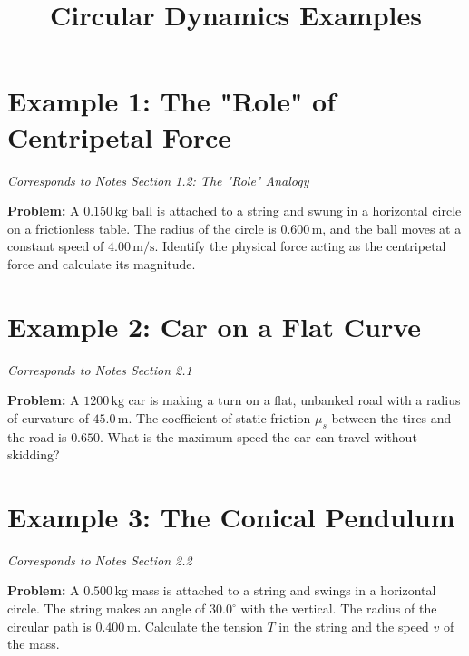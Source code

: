 \documentclass[12pt]{article}
\begin{document}
\title{Circular Dynamics Examples}
\author{}
\date{}
\maketitle

\vspace{1em}

\section*{Example 1: The "Role" of Centripetal Force}
\textit{Corresponds to Notes Section 1.2: The "Role" Analogy}

\textbf{Problem:}
A $0.150 \, \text{kg}$ ball is attached to a string and swung in a horizontal circle on a frictionless table. The radius of the circle is $0.600 \, \text{m}$, and the ball moves at a constant speed of $4.00 \, \text{m/s}$. 
Identify the physical force acting as the centripetal force and calculate its magnitude.

\newpage

\section*{Example 2: Car on a Flat Curve}
\textit{Corresponds to Notes Section 2.1}

\textbf{Problem:}
A $1200 \, \text{kg}$ car is making a turn on a flat, unbanked road with a radius of curvature of $45.0 \, \text{m}$. The coefficient of static friction $\mu_s$ between the tires and the road is $0.650$. What is the maximum speed the car can travel without skidding?

\newpage

\section*{Example 3: The Conical Pendulum}
\textit{Corresponds to Notes Section 2.2}

\textbf{Problem:}
A $0.500 \, \text{kg}$ mass is attached to a string and swings in a horizontal circle. The string makes an angle of $30.0^\circ$ with the vertical. The radius of the circular path is $0.400 \, \text{m}$. Calculate the tension $T$ in the string and the speed $v$ of the mass.
\end{document}
